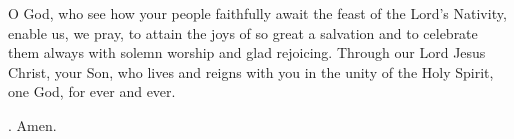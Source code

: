\lettrine[lines=3]{O}{} God, who see how your people
faithfully await the feast of the Lord’s Nativity,
enable us, we pray,
to attain the joys of so great a salvation
and to celebrate them always
with solemn worship and glad rejoicing.
Through our Lord Jesus Christ, your Son,
who lives and reigns with you in the unity of the Holy Spirit,
one God, for ever and ever. \par \Rbar. Amen.

